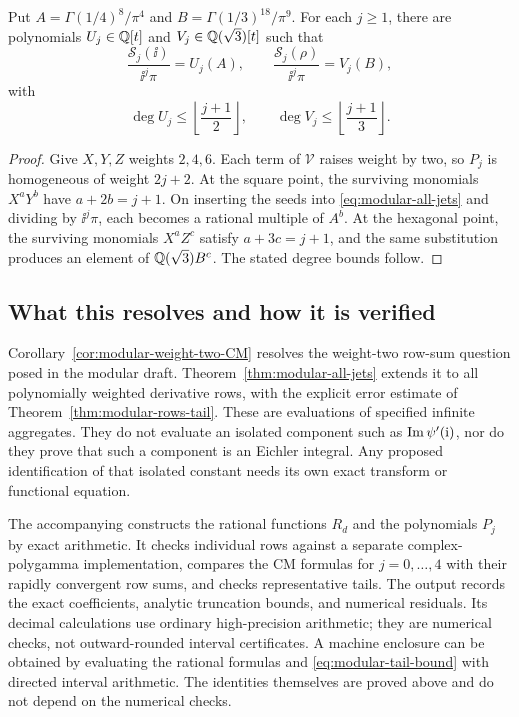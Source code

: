 \begin{corollary}
\label{cor:modular-CM-degree}
Put
\(A=\Gamma(1/4)^8/\pi^4\) and
\(B=\Gamma(1/3)^{18}/\pi^9\). For each \(j\ge1\), there are
polynomials \(U_j\in\mathbb{Q}[t]\) and
\(V_j\in\mathbb{Q}(\sqrt3)[t]\) such that
\[
\frac{\mathcal S_j(\ii)}{\ii^j\pi}=U_j(A),\qquad
\frac{\mathcal S_j(\rho)}{\ii^j\pi}=V_j(B),
\]
with
\[
\deg U_j\le\left\lfloor\frac{j+1}{2}\right\rfloor,
\qquad
\deg V_j\le\left\lfloor\frac{j+1}{3}\right\rfloor.
\]
\end{corollary}
\begin{proof}
Give \(X,Y,Z\) weights \(2,4,6\). Each term of
\(\mathcal V\) raises weight by two, so \(P_j\) is homogeneous
of weight \(2j+2\). At the square point, the surviving monomials
\(X^aY^b\) have \(a+2b=j+1\). On inserting the seeds into
\eqref{eq:modular-all-jets} and dividing by \(\ii^j\pi\), each
becomes a rational multiple of \(A^b\). At the hexagonal point,
the surviving monomials \(X^aZ^c\) satisfy \(a+3c=j+1\), and
the same substitution produces an element of
\(\mathbb{Q}(\sqrt3)B^c\). The stated degree bounds follow.
\end{proof}

\subsection{What this resolves and how it is verified}

Corollary~\ref{cor:modular-weight-two-CM} resolves the weight-two
row-sum question posed in the modular draft. Theorem~\ref{thm:modular-all-jets}
extends it to all polynomially weighted derivative rows, with the
explicit error estimate of Theorem~\ref{thm:modular-rows-tail}.
These are evaluations of specified infinite aggregates. They do not
evaluate an isolated component such as \(\operatorname{Im}\psi'(\mathrm{i})\), nor
do they prove that such a component is an Eichler integral. Any proposed
identification of that isolated constant needs its own exact transform
or functional equation.

The accompanying  constructs the rational
functions \(R_d\) and the polynomials \(P_j\) by exact arithmetic.
It checks individual rows against a separate complex-polygamma
implementation, compares the CM formulas for \(j=0,\ldots,4\) with
their rapidly convergent row sums, and checks representative tails.
The output  records the exact coefficients,
analytic truncation bounds, and numerical residuals. Its decimal
calculations use ordinary high-precision arithmetic; they are numerical
checks, not outward-rounded interval certificates. A machine enclosure
can be obtained by evaluating the rational formulas and
\eqref{eq:modular-tail-bound} with directed interval arithmetic. The
identities themselves are proved above and do not depend on the
numerical checks.
